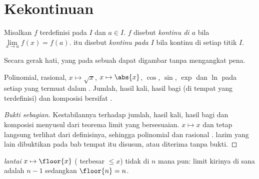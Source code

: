 \section{Kekontinuan}

\begin{definition}[Kekontinuan]\label{def:g12:limcont:continuity}
Misalkan $f$ terdefinisi pada  $I$ dan $a \in I$.  $f$ disebut
\emph{kontinu di $a$} bila
$\lim\limits_{x \to a} f(x) = f(a)$.  itu disebut \emph{kontinu pada $I$} bila
kontinu di setiap titik $I$.
\end{definition}

Secara gerak hati,   yang  pada sebuah  dapat
digambar tanpa mengangkat pena.

\begin{proposition}\label{prop:g12:limcont:usual}
Polinomial,  rasional, $x \mapsto \sqrt{x}$, $x \mapsto \abs{x}$,
$\cos$, $\sin$, $\exp$ dan $\ln$  pada setiap  yang termuat
dalam . Jumlah, hasil kali, hasil bagi (di tempat yang
terdefinisi) dan komposisi   bersifat .
\end{proposition}

\begin{proof}[Bukti sebagian]
Kestabilannya terhadap jumlah, hasil kali, hasil bagi dan komposisi menyusul
dari teorema limit yang bersesuaian.  $x \mapsto x$ dan 
tetap langsung terlihat dari definisinya, sehingga polinomial dan 
rasional .   lazim yang lain dibuktikan pada bab
tempat  itu disusun, atau diterima tanpa bukti.
\end{proof}

\begin{example}
\emph{ lantai} $x \mapsto \floor{x}$ ( terbesar
$\leq x$) tidak  di  $n$ mana pun: limit kirinya di sana
adalah $n - 1$ sedangkan $\floor{n} = n$.
\end{example}

